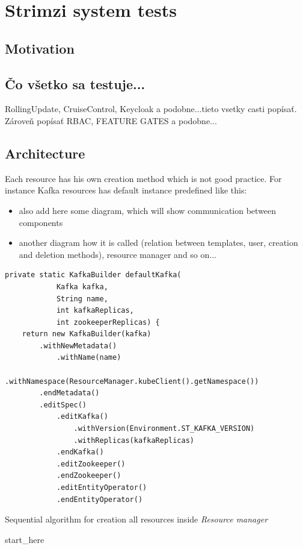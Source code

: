 \section{Strimzi system tests}
\label{02:sec:strimzisystemtests}

\subsection*{Motivation}

\subsection*{Čo všetko sa testuje...}

RollingUpdate, CruiseControl, Keycloak a podobne...tieto vsetky casti popísať. Zároveň popísať RBAC, FEATURE GATES a podobne...

\subsection*{Architecture}

Each resource has his own creation method which is not good practice. For instance Kafka resources has default instance predefined like this:

\begin{itemize}[itemsep=1mm, parsep=0pt]
    \item also add here some diagram, which will show communication between components
    \item another diagram how it is called (relation between templates, user, creation and deletion methods), resource manager and so on...
\end{itemize}

\begin{verbatim}
private static KafkaBuilder defaultKafka(
            Kafka kafka, 
            String name, 
            int kafkaReplicas, 
            int zookeeperReplicas) {
    return new KafkaBuilder(kafka)
        .withNewMetadata()
            .withName(name)
            .withNamespace(ResourceManager.kubeClient().getNamespace())
        .endMetadata()
        .editSpec()
            .editKafka()
                .withVersion(Environment.ST_KAFKA_VERSION)
                .withReplicas(kafkaReplicas)
            .endKafka()
            .editZookeeper()
            .endZookeeper()
            .editEntityOperator()
            .endEntityOperator()
\end{verbatim}

\begin{algorithm}[H]
\label{01:alg:dsds}
\caption{Sequential algorithm for creation all resources inside \emph{Resource manager}}

    \begin{algorithmic}[1]
        \State start\_here
    \end{algorithmic}
\end{algorithm}


